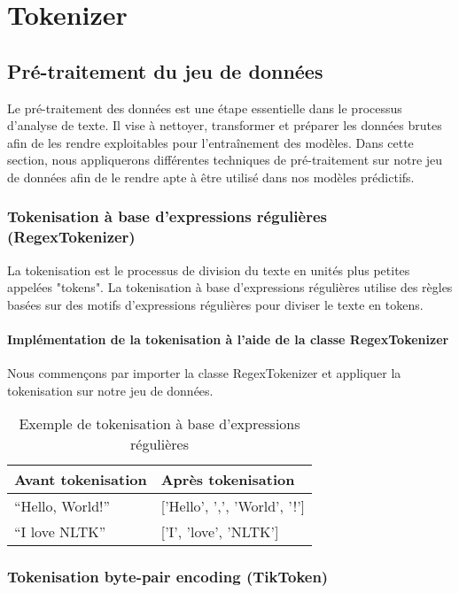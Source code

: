 \chapter{Tokenizer}

\section{Pré-traitement du jeu de données}

Le pré-traitement des données est une étape essentielle dans le processus d'analyse de texte. Il vise à nettoyer, transformer et préparer les données brutes afin de les rendre exploitables pour l'entraînement des modèles. Dans cette section, nous appliquerons différentes techniques de pré-traitement sur notre jeu de données afin de le rendre apte à être utilisé dans nos modèles prédictifs.

\subsection{Tokenisation à base d’expressions régulières (RegexTokenizer)}

La tokenisation est le processus de division du texte en unités plus petites appelées "tokens". La tokenisation à base d’expressions régulières utilise des règles basées sur des motifs d'expressions régulières pour diviser le texte en tokens.

\subsubsection*{Implémentation de la tokenisation à l'aide de la classe RegexTokenizer}

Nous commençons par importer la classe RegexTokenizer et appliquer la tokenisation sur notre jeu de données.

\begin{table}[h]
\centering
\begin{tabular}{|l|l|}
\hline
\textbf{Avant tokenisation} & \textbf{Après tokenisation} \\ \hline
``Hello, World!'' & ['Hello', ',', 'World', '!'] \\ \hline
``I love NLTK'' & ['I', 'love', 'NLTK'] \\ \hline
\end{tabular}
\caption{Exemple de tokenisation à base d'expressions régulières}
\end{table}

\subsection{Tokenisation byte-pair encoding (TikToken)}

